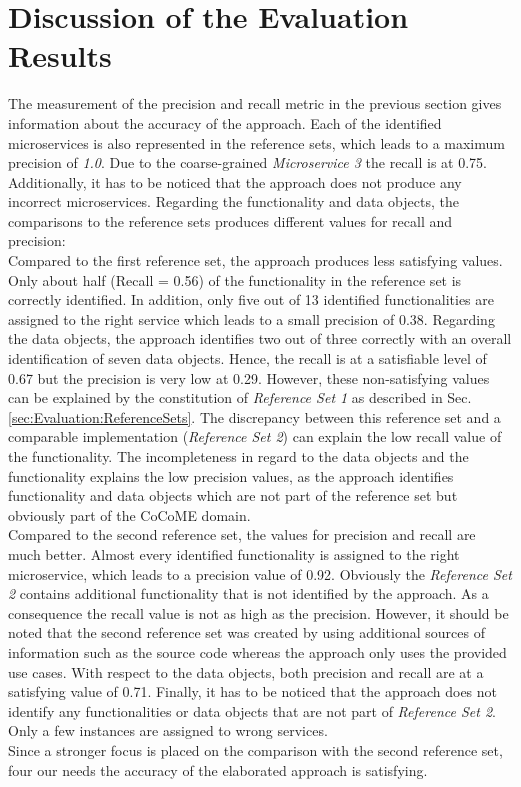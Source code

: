 \section{Discussion of the Evaluation Results}
\label{sec:Evalutation:Results}
The measurement of the precision and recall metric in the previous section gives information about the accuracy of the approach. Each of the identified microservices is also represented in the reference sets, which leads to a maximum precision of \textit{1.0}. Due to the coarse-grained \textit{Microservice 3} the recall is at 0.75. Additionally, it has to be noticed that the approach does not produce any incorrect microservices. Regarding the functionality and data objects, the comparisons to the reference sets produces different values for recall and precision:\\

\noindent
Compared to the first reference set, the approach produces less 
satisfying values. Only about half (Recall = 0.56) of the functionality in the reference set is correctly identified.  In addition, only five out of 13 identified functionalities are assigned to the right service which leads to a small precision of 0.38. Regarding the data objects, the approach identifies two out of three correctly with an overall identification of seven data objects. Hence, the recall is at a satisfiable level of 0.67 but the precision is very low at 0.29. However, these non-satisfying values can be explained by the constitution of \textit{Reference Set 1} as described in Sec.\ref{sec:Evaluation:ReferenceSets}. The discrepancy between this reference set and a comparable implementation (\textit{Reference Set 2}) can explain the low recall value of the functionality. The incompleteness in regard to the data objects and the functionality explains the low precision values, as the approach identifies functionality and data objects which are not part of the reference set but obviously part of the CoCoME domain.\\

\noindent
Compared to the second reference set, the values for precision and recall are much better. Almost every identified functionality is assigned to the right microservice, which leads to a precision value of 0.92. Obviously the \textit{Reference Set 2} contains additional functionality that is not identified by the approach. As a consequence the recall value is not as high as the precision. However, it should be noted that the second reference set was created by using additional sources of information such as the source code whereas the approach only uses the provided use cases. With respect to the data objects, both precision and recall are at a satisfying value of 0.71. Finally, it has to be noticed that the approach does not identify any functionalities or data objects that are not part of \textit{Reference Set 2}. Only a few instances are assigned to wrong services. \\
Since a stronger focus is placed on the comparison with the second reference set, four our needs the accuracy of the elaborated approach is satisfying.
 






